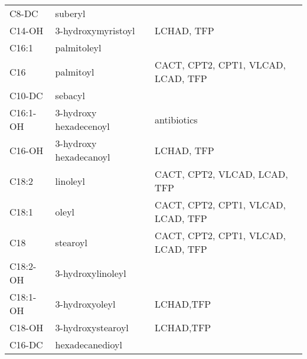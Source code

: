 \documentclass{scrartcl}
\begin{document}
\begin{table}[htbp]
\begin{tabular}{lll}
C8-DC & suberyl & \\
C14-OH & 3-hydroxymyristoyl & LCHAD, TFP\\
C16:1 & palmitoleyl & \\
C16 & palmitoyl & CACT, CPT2, CPT1, VLCAD, LCAD, TFP\\
C10-DC & sebacyl & \\
C16:1-OH & 3-hydroxy hexadecenoyl & antibiotics\\
C16-OH & 3-hydroxy hexadecanoyl & LCHAD, TFP\\
C18:2 & linoleyl & CACT, CPT2, VLCAD, LCAD, TFP\\
C18:1 & oleyl & CACT, CPT2, CPT1, VLCAD, LCAD, TFP\\
C18 & stearoyl & CACT, CPT2, CPT1, VLCAD, LCAD, TFP\\
C18:2-OH & 3-hydroxylinoleyl & \\
C18:1-OH & 3-hydroxyoleyl & LCHAD,TFP\\
C18-OH & 3-hydroxystearoyl & LCHAD,TFP\\
C16-DC & hexadecanedioyl & \\
\end{tabular}
\end{table}
\end{document}
